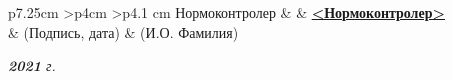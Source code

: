 \begin{titlepage}
\begin{table}[h!]
		\vspace{\baselineskip}

		\begin{signstabular}[0.7]{p{7.25cm} >{\centering\arraybackslash}p{4cm} >{\centering\arraybackslash}p{4.1 cm}}
			Нормоконтролер & \uline{\mbox{\hspace*{4cm}}} & \uline{\hfill \textbf{<Нормоконтролер>} \hfill} \\
			& \scriptsize (Подпись, дата) & \scriptsize (И.О. Фамилия)
		\end{signstabular}
	\end{table}

	\vfill

	\begin{center}
		\normalsize \textit{\textbf{2021} г.}
	\end{center}
\end{titlepage}
